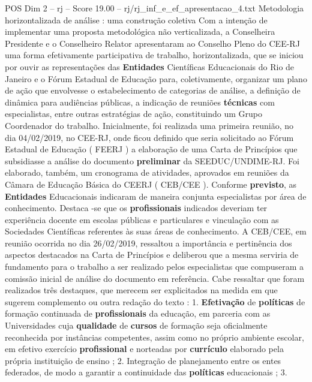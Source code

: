 \begin{textsample}{POS Dim 2 – rj – Score 19.00 – rj/rj\_inf\_e\_ef\_apresentacao\_4.txt}  \label{ex:f2_pos_233}
Metodologia horizontalizada de análise : uma construção coletiva Com a intenção de implementar uma proposta metodológica não verticalizada, a Conselheira Presidente e o Conselheiro Relator apresentaram ao Conselho Pleno do CEE-RJ uma forma efetivamente participativa de trabalho, horizontalizada, que se iniciou por ouvir as representações das \textbf{Entidades} Científicas Educacionais do Rio de Janeiro e o Fórum Estadual de Educação para, coletivamente, organizar um plano de ação que envolvesse o estabelecimento de categorias de análise, a definição de dinâmica para audiências públicas, a indicação de reuniões \textbf{técnicas} com especialistas, entre outras estratégias de ação, constituindo um Grupo Coordenador do trabalho.
Inicialmente, foi realizada uma primeira reunião, no dia 04/02/2019, no CEE-RJ, onde ficou definido que seria solicitado ao Fórum Estadual de Educação ( FEERJ ) a elaboração de uma Carta de Princípios que subsidiasse a análise do documento \textbf{preliminar} da SEEDUC/UNDIME-RJ.
Foi elaborado, também, um cronograma de atividades, aprovados em reuniões da Câmara de Educação Básica do CEERJ ( CEB/CEE ).
Conforme \textbf{previsto}, as \textbf{Entidades} Educacionais indicaram de maneira conjunta especialistas por área de conhecimento.
Destaca -se que os \textbf{profissionais} indicados deveriam ter experiência docente em escolas públicas e particulares e vinculação com as Sociedades Científicas referentes às suas áreas de conhecimento.
A CEB/CEE, em reunião ocorrida no dia 26/02/2019, ressaltou a importância e pertinência dos aspectos destacados na Carta de Princípios e deliberou que a mesma serviria de fundamento para o trabalho a ser realizado pelos especialistas que compuseram a comissão inicial de análise do documento em referência.
Cabe ressaltar que foram realizados três destaques, que merecem ser explicitados na medida em que sugerem complemento ou outra redação do texto : 1. \textbf{Efetivação} de \textbf{políticas} de formação continuada de \textbf{profissionais} da educação, em parceria com as Universidades cuja \textbf{qualidade} de \textbf{cursos} de formação seja oficialmente reconhecida por instâncias competentes, assim como no próprio ambiente escolar, em efetivo exercício \textbf{profissional} e norteadas por \textbf{currículo} elaborado pela própria instituição de ensino ; 2.
Integração de planejamento entre os entes federados, de modo a garantir a continuidade das \textbf{políticas} educacionais ; 3.

\end{textsample}
